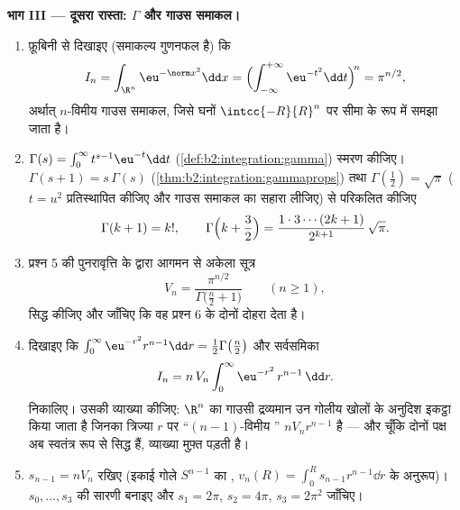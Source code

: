 \begin{problem}[{सप्ताहांत समस्या --- $V_n =
\pi^{n/2}/\Gamma(\frac n2 + 1)$, और ऊँची विमाओं की विचित्रता}]
\medskip
\noindent\textbf{भाग III --- दूसरा रास्ता: $\Gamma$ और गाउस
समाकल।}
\begin{enumerate}[resume]
  \item फ़ूबिनी से दिखाइए (समाकल्य गुणनफल है) कि
        \[
        I_n = \int_{\R^n}\eu^{-\norm
        x^2}\dd x
        = \Bigl(\int_{-\infty}^{+\infty}
        \eu^{-t^2}\dd t\Bigr)^{\!n} = \pi^{n/2},
        \]
        अर्थात् $n$-विमीय गाउस समाकल, जिसे घनों $\intcc{-R}{R}^n$ पर सीमा के
        रूप में समझा जाता है।
  \item $\Gamma(s) = \int_0^\infty t^{s-1}\eu^{-t}\dd
        t$ (\cref{def:b2:integration:gamma}) स्मरण कीजिए। $\Gamma(s+1) = s\,\Gamma(s)$ (\cref{thm:b2:integration:gammaprops}) तथा $\Gamma(\tfrac12) = \sqrt\pi$ ($t = u^2$
        प्रतिस्थापित कीजिए और गाउस समाकल का सहारा लीजिए) से
        परिकलित कीजिए
        \[
        \Gamma(k + 1) = k!,
        \qquad
        \Gamma\Bigl(k + \frac32\Bigr) =
        \frac{1\cdot3\cdots(2k+1)}{2^{k+1}}\,\sqrt\pi .
        \]
  \item प्रश्न 5 की पुनरावृत्ति के द्वारा आगमन से अकेला सूत्र
        \[
        V_n = \frac{\pi^{n/2}}{\Gamma\bigl(\frac n2 +
        1\bigr)} \qquad (n \geq 1),
        \]
        सिद्ध कीजिए और जाँचिए कि वह प्रश्न 6 के दोनों  दोहरा देता है।
  \item दिखाइए कि $\int_0^\infty \eu^{-r^2}r^{n-1}\dd r =
        \tfrac12\Gamma\bigl(\tfrac n2\bigr)$ और सर्वसमिका
        \[
        I_n = n\,V_n\int_0^\infty \eu^{-r^2}\,r^{n-1}\,\dd r.
        \]
        निकालिए। उसकी व्याख्या कीजिए: $\R^n$ का गाउसी द्रव्यमान
        उन गोलीय खोलों के अनुदिश इकट्ठा किया जाता है जिनका
        त्रिज्या $r$ पर ``$(n-1)$-विमीय '' $nV_nr^{n-1}$ है ---
        और चूँकि दोनों पक्ष अब स्वतंत्र रूप से सिद्ध हैं,
        व्याख्या मुफ़्त पड़ती है।
  \item $s_{n-1} = nV_n$ रखिए (इकाई गोले $S^{n-1}$ का , $v_n(R) = \int_0^R
        s_{n-1}r^{n-1}\dd r$ के
        अनुरूप)। $s_0, \dots, s_3$ की सारणी बनाइए और $s_1 = 2\pi$, $s_2 = 4\pi$, $s_3 = 2\pi^2$
        जाँचिए।
\end{enumerate}


\end{problem}
